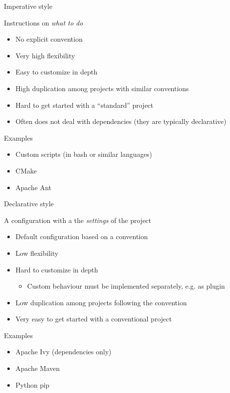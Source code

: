 \documentclass[presentation]{beamer}
\begin{document}
\begin{frame}{Imperative style}
    \begin{block}{Instructions on \textit{what to do}}
        \begin{itemize}
            \item No explicit convention
            \item Very high flexibility
            \item Easy to customize in depth
            \item High duplication among projects with similar conventions
            \item Hard to get started with a ``standard'' project
            \item Often does not deal with dependencies (they are typically declarative)
        \end{itemize}
    \end{block}
    \begin{block}{Examples}
        \begin{itemize}
            \item Custom scripts (in bash or similar languages)
            \item CMake
            \item Apache Ant
        \end{itemize}
    \end{block}
\end{frame}
\begin{frame}{Declarative style}
    \begin{block}{A configuration with a the \textit{settings} of the project}
        \begin{itemize}
            \item Default configuration based on a convention
            \item Low flexibility
            \item Hard to customize in depth
            \begin{itemize}
                \item Custom behaviour must be implemented separately, e.g. as plugin
            \end{itemize}
            \item Low duplication among projects following the convention
            \item Very easy to get started with a conventional project
        \end{itemize}
    \end{block}
    \begin{block}{Examples}
        \begin{itemize}
            \item Apache Ivy (dependencies only)
            \item Apache Maven
            \item Python pip
        \end{itemize}
    \end{block}
\end{frame}
\end{document}

